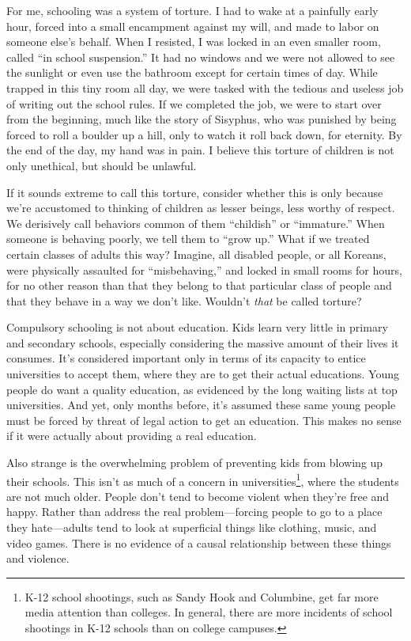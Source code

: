 For me, schooling was a system of torture. I had to wake at a painfully early hour, forced into a small encampment against my will, and made to labor on someone else's behalf. When I resisted, I was locked in an even smaller room, called ``in school suspension.'' It had no windows and we were not allowed to see the sunlight or even use the bathroom except for certain times of day. While trapped in this tiny room all day, we were tasked with the tedious and useless job of writing out the school rules. If we completed the job, we were to start over from the beginning, much like the story of Sisyphus, who was punished by being forced to roll a boulder up a hill, only to watch it roll back down, for eternity. By the end of the day, my hand was in pain. I believe this torture of children is not only unethical, but should be unlawful.

If it sounds extreme to call this torture, consider whether this is only because we're accustomed to thinking of children as lesser beings, less worthy of respect. We derisively call behaviors common of them ``childish'' or ``immature.'' When someone is behaving poorly, we tell them to ``grow up.'' What if we treated certain classes of adults this way? Imagine, all disabled people, or all Koreans, were physically assaulted for ``misbehaving,'' and locked in small rooms for hours, for no other reason than that they belong to that particular class of people and that they behave in a way we don't like. Wouldn't \emph{that} be called torture?

Compulsory schooling is not about education. Kids learn very little in primary and secondary schools, especially considering the massive amount of their lives it consumes. It's considered important only in terms of its capacity to entice universities to accept them, where they are to get their actual educations. Young people do want a quality education, as evidenced by the long waiting lists at top universities. And yet, only months before, it's assumed these same young people must be forced by threat of legal action to get an education. This makes no sense if it were actually about providing a real education.

Also strange is the overwhelming problem of preventing kids from blowing up their schools. This isn't as much of a concern in universities\footnote{K-12 school shootings, such as Sandy Hook and Columbine, get far more media attention than colleges. In general, there are more incidents of school shootings in K-12 schools than on college campuses.\cite{wikipedia-school-shootings}}, where the students are not much older. People don't tend to become violent when they're free and happy. Rather than address the real problem---forcing people to go to a place they hate---adults tend to look at superficial things like clothing, music, and video games. There is no evidence of a causal relationship between these things and violence.


